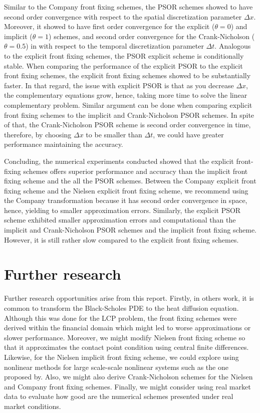 Similar to the Company front fixing schemes, the PSOR schemes showed to have second order convergence with respect to the spatial discretization parameter $\Delta{x}$. Moreover, it showed to have first order convergence for the explicit ($\theta=0$) and implicit ($\theta=1$) schemes, and second order convergence for the Crank-Nicholson ($\theta=0.5$) in with respect to the temporal discretization parameter $\Delta{t}$. Analogous to the explicit front fixing schemes, the PSOR explicit scheme is conditionally stable. When comparing the performance of the explicit PSOR to the explicit front fixing schemes, the explicit front fixing schemes showed to be substantially faster. In that regard, the issue with explicit PSOR is that as you decrease $\Delta{x}$, the complementary equations grow, hence, taking more time to solve the linear complementary problem. Similar argument can be done when comparing explicit front fixing schemes to the implicit and Crank-Nicholson PSOR schemes. In spite of that, the Crank-Nicholson PSOR scheme is second order convergence in time, therefore, by choosing $\Delta{x}$ to be smaller than $\Delta{t}$, we could have greater performance maintaining the accuracy. 

Concluding, the numerical experiments conducted showed that the explicit front-fixing schemes offers superior performance and accuracy than the implicit front fixing scheme and the all the PSOR schemes. Between the Company explicit front fixing scheme and the Nielsen explicit front fixing scheme, we recommend using the Company transformation because it has second order convergence in space, hence, yielding to smaller approximation errors. Similarly, the explicit PSOR scheme exhibited smaller approximation errors and computational than the implicit and Crank-Nicholson PSOR schemes and the implicit front fixing scheme. However, it is still rather slow compared to the explicit front fixing schemes.

\section{Further research}

Further research opportunities arise from this report. Firstly, in others work\cite{dewynne_howison_wilmott_howison_1995}\cite{seydel_2009}\cite{wu1997front}, it is common to transform the Black-Scholes PDE to the heat diffusion equation. Although this was done for the LCP problem, the front fixing schemes were derived within the financial domain which might led to worse approximations or slower performance. Moreover, we might modify Nielsen front fixing scheme so that it approximates the contact point condition using central finite differences. Likewise, for the Nielsen implicit front fixing scheme, we could explore using nonlinear methods for large scale-scale nonlinear systems such as the one proposed by\cite{lacruz_2006}. Also, we might also derive Crank-Nicholson schemes for the Nielsen and Company front fixing schemes. Finally, we might consider using real market data to evaluate how good are the numerical schemes presented under real market conditions.

